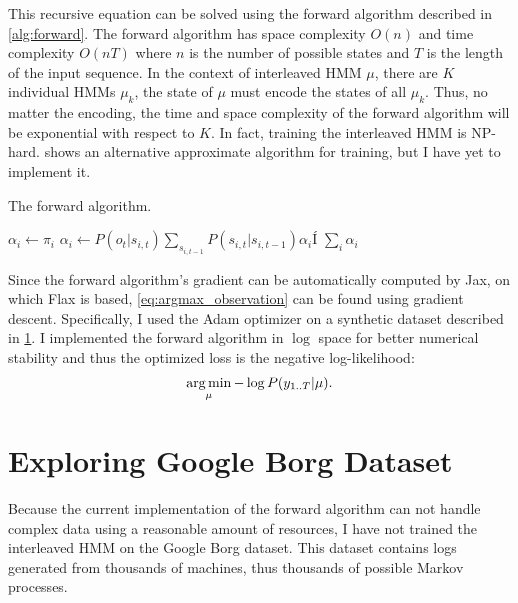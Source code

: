 This recursive equation can be solved using the forward algorithm described in
\cref{alg:forward}. The forward algorithm has space complexity \(O(n)\)  and
time complexity \(O(nT)\) where \(n\) is the number of possible states and \(T\)
is the length of the input sequence. In the context of interleaved HMM \(\mu\),
there are \(K\) individual HMMs \(\mu_k\), the state of \(\mu\) must encode the
states of all \(\mu_k\). Thus, no matter the encoding, the time and space
complexity of the forward algorithm will be exponential with respect to \(K\).
In fact, training the interleaved HMM is NP-hard\cite{Landwehr2008-vw}.
\citeauthor{Landwehr2008-vw} shows an alternative approximate algorithm for
training, but I have yet to implement it.
\begin{algorithm}[H]
    \caption{The forward algorithm.}\label{alg:forward}
    \begin{algorithmic}[1]
        \State $\alpha_i \gets \pi_i$
        \EndFor
        \State $\alpha_i \gets P(o_t|s_{i,t}) \sum_{s_{i, t-1}} P(s_{i, t} | s_{i, t-1}) \alpha_i$Í
        \EndFor
        \EndFor
        \State \Return $\sum_{i} \alpha_i$
        \EndFunction
    \end{algorithmic}
\end{algorithm}

Since the forward algorithm's gradient can be automatically computed by
Jax\cite{Bradbury2018-jz}, on which Flax is based, \cref{eq:argmax_observation}
can be found using gradient descent. Specifically, I used the
Adam\cite{Kingma2014-jj} optimizer on a synthetic dataset described in
\cref{sec:dataset}. I implemented the forward algorithm in \(\log\) space for
better numerical stability and thus the optimized loss is the negative
log-likelihood:
\begin{equation}
    \label{eq:neg_log_likelihood}
    \operatorname*{arg\,min}_{\mu} - \log P(y_{1..T} | \mu).
\end{equation}

\section{Exploring Google Borg Dataset}\label{sec:dataset}

Because the current implementation of the forward algorithm can not handle
complex data using a reasonable amount of resources, I have not trained the
interleaved HMM on the Google Borg dataset. This dataset contains logs generated
from thousands of machines, thus thousands of possible Markov processes.

